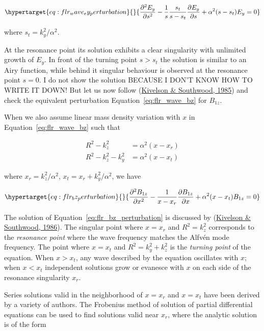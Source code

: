 \documentclass[
  notoc %
]{tufte-book}
\begin{document}
\begin{equation}\protect\hypertarget{eq:flr_wave_ey_perturbation}{}{
\frac{\partial^2 E_y}{\partial s^2} - \frac{1}{s}\frac{s_t}{s-s_t}\frac{\partial E_y}{\partial s} + \alpha^2(s-s_t) E_y = 0
}\label{eq:flr_wave_ey_perturbation}\end{equation}

where \(s_t = k_y^2/\alpha^2\).

At the resonance point its solution exhibits a clear singularity with
unlimited growth of \(E_y\). In front of the turning point \(s>s_t\) the
solution is similar to an Airy function, while behind it singular
behaviour is observed at the resonance point \(s=0\). I do not show the
solution BECAUSE I DON'T KNOW HOW TO WRITE IT DOWN! But let us now
follow (\protect\hyperlink{ref-kivelson1985resonant}{Kivelson \&
Southwood, 1985}) and check the equivalent perturbation
Equation~\ref{eq:flr_wave_bz} for \(B_{1z}\).

When we also assume linear mass density variation with \(x\) in
Equation~\ref{eq:flr_wave_bz} such that

\[
\begin{aligned}
R^2 - k_z^2 &= \alpha^2(x - x_r) \\
R^2 - k_z^2 - k_y^2 &= \alpha^2(x-x_t)
\end{aligned}
\]

where \(x_r = k_z^2/\alpha^2\), \(x_t = x_r + k_y^2/\alpha^2\), we have

\begin{equation}\protect\hypertarget{eq:flr_bz_perturbation}{}{
\frac{\partial^2 B_{1z}}{\partial x^2} - \frac{1}{x-x_r}\frac{\partial B_{1z}}{\partial x} + \alpha^2(x-x_t)B_{1z} = 0
}\label{eq:flr_bz_perturbation}\end{equation}

The solution of Equation~\ref{eq:flr_bz_perturbation} is discussed by
(\protect\hyperlink{ref-kivelson1986coupling}{Kivelson \& Southwood,
1986}). The singular point where \(x=x_r\) and \(R^2=k_z^2\) corresponds
to the \emph{resonance point} where the wave frequency matches the
Alfvén mode frequency. The point where \(x=x_t\) and
\(R^2=k_y^2 + k_z^2\) is the \emph{turning point} of the equation. When
\(x>x_t\), any wave described by the equation oscillates with \(x\);
when \(x<x_t\) independent solutions grow or evanesce with \(x\) on each
side of the resonance singularity \(x_r\).

Series solutions valid in the neighborhood of \(x=x_r\) and \(x=x_t\)
have been derived by a variety of authors. The Frobenius method of
solution of partial differential equations can be used to find solutions
valid near \(x_r\), where the analytic solution is of the form
\end{document}
